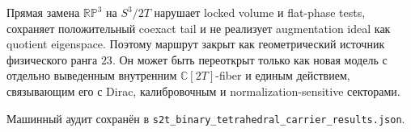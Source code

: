 \begin{nogocriterion}
Прямая замена \(\mathbb{RP}^3\) на \(S^3/2T\) нарушает locked volume и
flat-phase tests, сохраняет положительный coexact tail и не реализует
augmentation ideal как quotient eigenspace. Поэтому маршрут закрыт как
геометрический источник физического ранга \(23\). Он может быть переоткрыт
только как новая модель с отдельно выведенным внутренним
\(\mathbb C[2T]\)-fiber и единым действием, связывающим его с Dirac,
калибровочным и normalization-sensitive секторами.
\end{nogocriterion}

Машинный аудит сохранён в
\texttt{s2t\_binary\_tetrahedral\_carrier\_results.json}.